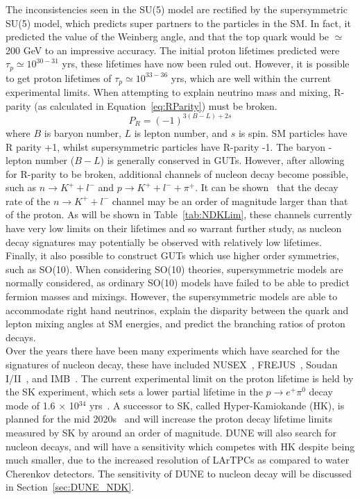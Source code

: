 The inconsistencies seen in the SU(5) model are rectified by the supersymmetric SU(5) model, which predicts super partners to the particles in the SM. In fact, it predicted the value of the Weinberg angle, and that the top quark would be $\simeq$200 GeV to an impressive accuracy. The initial proton lifetimes predicted were $\tau_{p} \simeq 10^{30-31}$ yrs, these lifetimes have now been ruled out. However, it is possible to get proton lifetimes of $\tau_{p} \simeq 10^{33-36}$ yrs, which are well within the current experimental limits. When attempting to explain neutrino mass and mixing, R-parity (as calculated in Equation~\ref{eq:RParity}) must be broken.
\begin{equation}
  \label{eq:RParity}
  P_{R} = (-1)^{3(B-L)+2s}
\end{equation}
where $B$ is baryon number, $L$ is lepton number, and $s$ is spin. SM particles have R parity +1, whilst supersymmetric particles have R-parity -1. The baryon - lepton number ($B-L$) is generally conserved in GUTs. However, after allowing for R-parity to be broken, additional channels of nucleon decay become possible, such as $n \rightarrow K^{+} + l^{-}$ and $p \rightarrow K^{+} + l^{-} + \pi^{+}$. It can be shown~\citep{Senjanovic:2009kr, Vissani:1995hp} that the decay rate of the $n \rightarrow K^{+} + l^{-}$ channel may be an order of magnitude larger than that of the proton. As will be shown in Table~\ref{tab:NDKLim}, these channels currently have very low limits on their lifetimes and so warrant further study, as nucleon decay signatures may potentially be observed with relatively low lifetimes. \\

Finally, it also possible to construct GUTs which use higher order symmetries, such as SO(10). When considering SO(10) theories, supersymmetric models are normally considered, as ordinary SO(10) models have failed to be able to predict fermion masses and mixings. However, the supersymmetric models are able to accommodate right hand neutrinos, explain the disparity between the quark and lepton mixing angles at SM energies, and predict the branching ratios of proton decays. \\

Over the years there have been many experiments which have searched for the signatures of nucleon decay, these have included NUSEX~\citep{BATTISTONI1983454}, FREJUS~\citep{berger:in2p3-00015565}, Soudan I/II~\citep{SoudanLim}, and IMB~\citep{Gajewski:1989gh}. The current experimental limit on the proton lifetime is held by the SK experiment, which sets a lower partial lifetime in the $p\ensuremath{\rightarrow}{e}^{+}{\ensuremath{\pi}}^{0}$ decay mode of 1.6 $\times$ 10$^{34}$ yrs~\citep{PhysRevD.95.012004}. A successor to SK, called Hyper-Kamiokande (HK), is planned for the mid 2020s~\citep{Abe:2011ts} and will increase the proton decay lifetime limits measured by SK by around an order of magnitude. DUNE will also search for nucleon decays, and will have a sensitivity which competes with HK despite being much smaller, due to the increased resolution of LArTPCs as compared to water Cherenkov detectors. The sensitivity of DUNE to nucleon decay will be discussed in Section~\ref{sec:DUNE_NDK}. \\  

